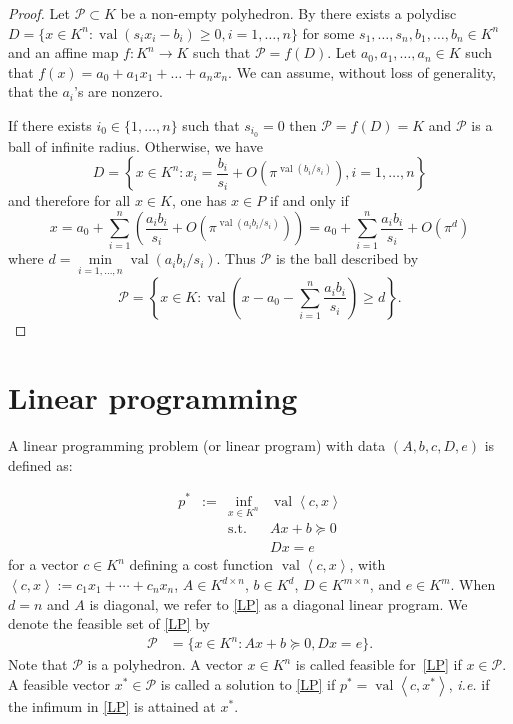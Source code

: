 \documentclass[sigconf]{acmart}
\newcommand{\PP}{\mathcal{P}}
\DeclareMathOperator{\val}{val}
\begin{document}
\begin{proof}
    Let $\PP \subset K$ be a non-empty polyhedron. By  there exists a polydisc $D = \{x \in K^n : \val(s_i x_i - b_i) \ge 0, i=1,\ldots,n \}$ for some $s_1,\ldots,s_n, b_1,\ldots,b_n \in K ^n$ and an affine map $f : K^n \to K$ such that $\PP = f(D)$. Let $a_0,a_1,\ldots,a_n \in K$ such that $f(x) = a_0 + a_1 x_1 + \ldots + a_n x_n$. We can assume, without loss of generality, that the $a_i$'s are nonzero. 

    If there exists $i_0 \in \{1,\ldots,n\}$ such that $s_{i_0} = 0$ then $\PP = f(D) = K$ and $\PP$ is a ball of infinite radius. Otherwise, we have
    $$
    D = \left\{x \in K^n : x_i = \frac{b_i}{s_i} + O\left( \pi^{\val(b_i/s_i)} \right), i=1,\ldots,n\right\}
    $$
    and therefore for all $x \in K$, one has $x \in P$ if and only if
    $$
    x = a_0 + \sum_{i=1}^{n}\left(\frac{a_i b_i}{s_i} + O( \pi^{\val(a_i b_i/s_i)}) \right)
    = a_0  + \sum_{i=1}^{n} \frac{a_i b_i}{s_i} + O(\pi^d)
    $$
    where $d = \min \limits_{i = 1,\ldots,n} \val(a_i b_i/s_i)$. Thus
    $\PP$ is the ball described by
    $$
    \PP = \left\{x \in K : \val\left(x - a_0 - \sum_{i=1}^{n} \frac{a_i b_i}{s_i}\right) \ge d\right\}.
    $$
\end{proof}





\section{Linear programming}
\label{sec:LP}
A {linear programming problem} (or {linear program})
{with data $(A,b,c,\allowbreak D,e)$} is defined as:

\begin{equation}
  \tag{LP}\label{LP}
\begin{array}{rcll}
  p^* & := & \inf_{x \in K^n} & \val \left\langle c, x \right\rangle \\
  &    & \text{s.t.}         & A x + b \succeq 0\\
  & & & D x = e
\end{array}
\end{equation}
for a vector $c \in K^n$ defining a cost function $\val\left\langle c, x \right\rangle$,
with $\left\langle c, x \right\rangle := c_1 x_1+\cdots +c_n x_n$,
$A \in K^{d \times n}$, $b \in K^d$, $D \in K^{m\times n}$, and $e \in K^m$.
When $d=n$ and $A$ is diagonal, %
we refer to \eqref{LP} as a {diagonal} linear program.
We denote the {feasible set} of \eqref{LP} by
\begin{equation*}
\begin{aligned}
  \PP &= \{x \in K^n : Ax + b \succeq 0, Dx = e\}.
\end{aligned}
\end{equation*}
Note that $\PP$ is a polyhedron.
A vector $x \in K^n$ is called {feasible} for~\eqref{LP} if $x \in \PP$. A feasible vector $x^* \in \PP$ is called a {solution} to \eqref{LP} if $p^* = \val\left\langle c,x^*\right\rangle$, {\it i.e.} if the infimum in \eqref{LP} is attained at $x^*$.
\end{document}
